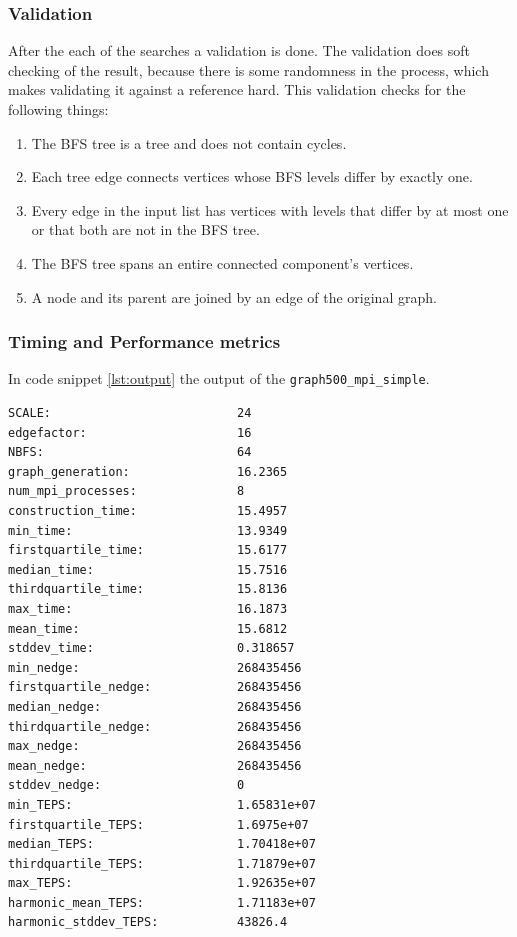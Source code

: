 \subsubsection{Validation}
After the each of the searches a validation is done. The validation does soft checking of the result, because there is some randomness in the process, which makes validating it against a reference hard. This validation checks for the following things:
\begin{enumerate}
\item The BFS tree is a tree and does not contain cycles.
\item Each tree edge connects vertices whose BFS levels differ by exactly one.
\item Every edge in the input list has vertices with levels that differ by at most one or that both are not in the BFS tree.
\item The BFS tree spans an entire connected component's vertices.
\item A node and its parent are joined by an edge of the original graph.
\end{enumerate}


\subsubsection{Timing and Performance metrics}
In code snippet \ref{lst:output} the output of the \texttt{graph500\_mpi\_simple}.
\begin{lstlisting}[label={lst:output}, caption= {Output of the benchmark.}]
SCALE:                          24
edgefactor:                     16
NBFS:                           64
graph_generation:               16.2365
num_mpi_processes:              8
construction_time:              15.4957
min_time:                       13.9349
firstquartile_time:             15.6177
median_time:                    15.7516
thirdquartile_time:             15.8136
max_time:                       16.1873
mean_time:                      15.6812
stddev_time:                    0.318657
min_nedge:                      268435456
firstquartile_nedge:            268435456
median_nedge:                   268435456
thirdquartile_nedge:            268435456
max_nedge:                      268435456
mean_nedge:                     268435456
stddev_nedge:                   0
min_TEPS:                       1.65831e+07
firstquartile_TEPS:             1.6975e+07
median_TEPS:                    1.70418e+07
thirdquartile_TEPS:             1.71879e+07
max_TEPS:                       1.92635e+07
harmonic_mean_TEPS:             1.71183e+07
harmonic_stddev_TEPS:           43826.4
\end{lstlisting}

